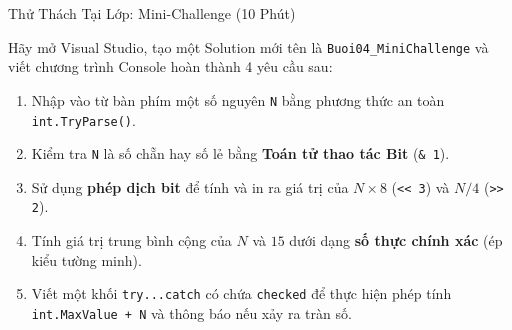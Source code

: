 \documentclass[aspectratio=169, 10pt]{beamer}
\begin{document}
\begin{frame}[fragile]{Thử Thách Tại Lớp: Mini-Challenge (10 Phút)}
  \begin{tcolorbox}[colback=UniOrange!10,colframe=UniOrange,title=\textbf{Đề bài Thực hành Mini-Challenge phòng máy},fonttitle=\small\bfseries]
    Hãy mở Visual Studio, tạo một Solution mới tên là \texttt{Buoi04\_MiniChallenge} và viết chương trình Console hoàn thành 4 yêu cầu sau:
    \begin{enumerate}\small
      \item Nhập vào từ bàn phím một số nguyên \texttt{N} bằng phương thức an toàn \texttt{int.TryParse()}.
      \item Kiểm tra \texttt{N} là số chẵn hay số lẻ bằng \textbf{Toán tử thao tác Bit} (\texttt{\& 1}).
      \item Sử dụng \textbf{phép dịch bit} để tính và in ra giá trị của $N \times 8$ (\texttt{<< 3}) và $N / 4$ (\texttt{>> 2}).
      \item Tính giá trị trung bình cộng của $N$ và $15$ dưới dạng \textbf{số thực chính xác} (ép kiểu tường minh).
      \item Viết một khối \texttt{try...catch} có chứa \texttt{checked} để thực hiện phép tính \texttt{int.MaxValue + N} và thông báo nếu xảy ra tràn số.
    \end{enumerate}
  \end{tcolorbox}
\end{frame}
\end{document}
